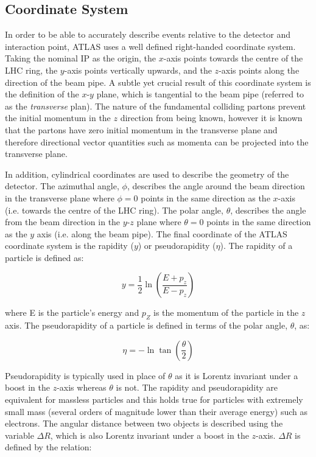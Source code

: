 \documentclass[12pt,a4paper,epsf,portrait,times,epsfig]{report}
\begin{document}
		\subsection{Coordinate System}

		In order to be able to accurately describe events relative to the detector and interaction point, ATLAS uses a well defined right-handed coordinate system. Taking the nominal IP as the origin, the $x$-axis points towards the centre of the LHC ring, the $y$-axis points vertically upwards, and the $z$-axis points along the direction of the beam pipe. A subtle yet crucial result of this coordinate system is the definition of the $x$-$y$ plane, which is tangential to the beam pipe (referred to as the \textit{transverse} plan). The nature of the fundamental colliding partons prevent the initial momentum in the $z$ direction from being known, however it is known that the partons have zero initial momentum in the transverse plane and therefore directional vector quantities such as momenta can be projected into the transverse plane. \par

		In addition, cylindrical coordinates are used to describe the geometry of the detector. The azimuthal angle, $\phi$, describes the angle around the beam direction in the transverse plane where $\phi = 0$ points in the same direction as the $x$-axis (i.e. towards the centre of the LHC ring). The polar angle, $\theta$, describes the angle from the beam direction in the $y$-$z$ plane where $\theta = 0$ points in the same direction as the $y$ axis (i.e. along the beam pipe). The final coordinate of the ATLAS coordinate system is the rapidity ($y$) or pseudorapidity ($\eta$). The rapidity of a particle is defined as: 

		\begin{equation}
			y = \frac{1}{2}\ln\left(\frac{E+p_{z}}{E-p_{z}}\right)
		\end{equation}

		where E is the particle's energy and $p_{Z}$ is the momentum of the particle in the $z$ axis. The pseudorapidity of a particle is defined in terms of the polar angle, $\theta$, as:

		\begin{equation}
			\eta = -\ln\tan\left(\frac{\theta}{2}\right)
		\end{equation}

		Pseudorapidity is typically used in place of $\theta$ as it is Lorentz invariant under a boost in the $z$-axis whereas $\theta$ is not. The rapidity and pseudorapidity are equivalent for massless particles and this holds true for particles with extremely small mass (several orders of magnitude lower than their average energy) such as electrons. The angular distance between two objects is described using the variable $\Delta R$, which is also Lorentz invariant under a boost in the $z$-axis. $\Delta R$ is defined by the relation:
\end{document}

